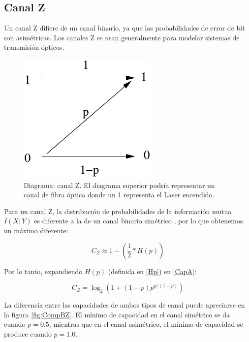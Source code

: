 
\subsection{Canal Z}
\label{canalZ}
Un canal Z difiere de un canal binario, ya que las probabilidades de error de bit son asimétricas.
Los canales Z se usan generalmente para modelar sistemas de transmisión ópticos.

\begin{figure}[th]
  \begin{center}
    \includegraphics[scale=1]{graphs/zchannel}
  \end{center}
  \caption{Diagrama: canal Z. El diagrama superior podría representar un canal de fibra óptica donde un 1 representa el Laser encendido.}
  \label{fig:Gal}
\end{figure}

Para un canal Z, la distribución de probabilidades de la información mutua $I(X;Y)$ es diferente a la de un canal binario simétrico \cite{Tallini:02}, por lo que obtenemos un máximo diferente:

\begin{equation}\label{CapA}
C_{Z} \approx 1 - \left(\frac{1}{2}*H(p)\right)
\end{equation}

Por lo tanto, expandiendo $H(p)$ (definida en \ref{Hp}) en \ref{CapA}:

$$ C_{Z} = \log_2\left(1+(1-p) p^{p/(1-p)}\right) $$

La diferencia entre las capacidades de ambos tipos de canal puede apreciarse en la figura \ref{fig:CompBZ}. El mínimo de capacidad en el canal simétrico se da cuando $p=0.5$, mientras que en el canal asimétrico, el mínimo de capacidad se produce cuando $p=1.0$.

